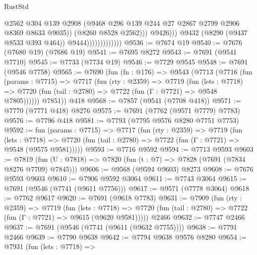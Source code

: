 \begin{lexlean}{RustStd}
\begin{coremodule}
                                          @2562
                                          @304
                                          @139
                                          @2908
                                          (@9468
                                            @296
                                            @139
                                            @244
                                            @27
                                            @2867
                                            @2799
                                            @2906
                                            @8369
                                            @8633
                                            @9035))
                                        (@8260 @8528 @2562)))
                                    @9426)))
                              @9432
                              (@8290 (@9437 @8533 @393 @464))
                              @9444)))))))))))))
@9536 := @7674 @19
@9540 := @7676 (@7680 @19) (@7686 @19)
@9541 := @7695 @8272
@9543 := @7691 (@9541 @7710)
@9545 := @7733 (@7734 @19)
@9546 := @7729 @9545
@9548 := @7691 (@9546 @7758)
@9565 := @7690
    (fun (fn : @176) =>
    @9543
      (@7713
        (@7716
          (fun (params : @7715) =>
          @7717
            (fun (rty : @2359) =>
            @7719
              (fun (lets : @7718) =>
              @7720 (fun (tail : @2780) => @7722 (fun (Γ : @7721) => @9548 @7805))))))
        @7851))
    @418
@9568 := @7857 (@9541 (@7708 @418))
@9571 := @7770 (@7771 @418) @8276
@9575 := @7691 (@7762 (@9571 @7779) @7783)
@9576 := @7796 @418
@9581 := @7793 (@7795 @9576 @8280 @7751 @7753)
@9592 := fun (params : @7715) =>
  @7717
    (fun (rty : @2359) =>
    @7719
      (fun (lets : @7718) =>
      @7720 (fun (tail : @2780) => @7722 (fun (Γ : @7721) => @9548 (@9575 @9581)))))
@9593 := @7716 @9592
@9594 := @7713 @9593
@9603 := @7819 (fun (U : @7818) => @7820 (fun (t : @7) => @7828 (@7691 (@7834 @8276 @7709) @7845)))
@9606 := @9568 (@9594 @9603) @8273
@9608 := @7676 @9593 @9603
@9610 := @7906 @9592 @3064
@9611 := @7743 @3064
@9615 := @7691 (@9546 (@7741 (@9611 @7756)))
@9617 := @9571 (@7778 @3064)
@9618 := @7762 @9617
@9620 := @7691 (@9618 @7783)
@9631 := @7909
    (fun (rty : @2359) =>
    @7719
      (fun (lets : @7718) =>
      @7720 (fun (tail : @2780) => @7722 (fun (Γ : @7721) => @9615 (@9620 @9581)))))
    @2466
@9632 := @7747 @2466
@9637 := @7691 (@9546 (@7741 (@9611 (@9632 @7755))))
@9638 := @7791 @2466
@9639 := @7790 @9638
@9642 := @7794 @9638 @9576 @8280
@9654 := @7931
    (fun (lets : @7718) =>

\end{coremodule}
\end{lexlean}
